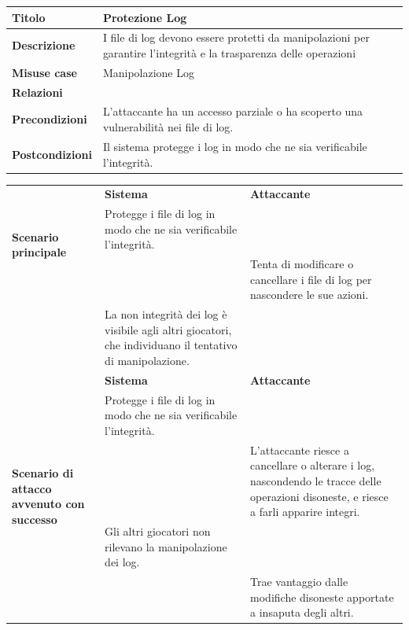 \documentclass[a4paper, 11pt]{article}
\begin{document}
\newpage
\begin{table}[h]\small   
\begin{center}
\begin{tabular}{ |p{4cm}|p{11cm}|  }
\hline
\textbf{Titolo} & Protezione Log \\
\hline
\textbf{Descrizione} & I file di log devono essere protetti da manipolazioni per garantire l'integrità e la trasparenza delle operazioni \\
\hline
\textbf{Misuse case} & Manipolazione Log  \\
\hline
\textbf{Relazioni} &  \\
\hline
\textbf{Precondizioni} & L'attaccante ha un accesso parziale o ha scoperto una vulnerabilità nei file di log.  \\
\hline
\textbf{Postcondizioni} & Il sistema protegge i log in modo che ne sia verificabile l'integrità.  \\
\hline
\end{tabular}
    \begin{tabular}{|p{4cm}|p{4.9cm}|p{5cm}|}
        \multirow{3}{=}{\textbf{Scenario principale}} & \textbf{Sistema} & \textbf{Attaccante}\\\cline{2-3}
         & Protegge i file di log in modo che ne sia verificabile l'integrità. &  \\\cline{2-3}
         & & Tenta di modificare o cancellare i file di log per nascondere le sue azioni. \\\cline{2-3}
         & La non integrità dei log è visibile agli altri giocatori, che individuano il tentativo di manipolazione. & \\
         \hline
         \multirow{5}{=}{\textbf{Scenario di attacco avvenuto con successo}} & \textbf{Sistema} & \textbf{Attaccante}\\\cline{2-3}
         & Protegge i file di log in modo che ne sia verificabile l'integrità. &  \\\cline{2-3}
         && L'attaccante riesce a cancellare o alterare i log, nascondendo le tracce delle operazioni disoneste, e riesce a farli apparire integri. \\\cline{2-3}
         & Gli altri giocatori non rilevano la manipolazione dei log. & \\\cline{2-3}
         && Trae vantaggio dalle modifiche disoneste apportate a insaputa degli altri. \\
    \hline
    \end{tabular}
    \end{center}
\end{table}
\end{document}
